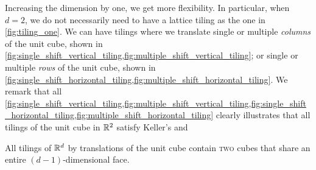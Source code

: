\documentclass[../thesis.tex]{subfiles}
\begin{document}
Increasing the dimension by one, we get more flexibility. In particular, when $d=2$, we do not necessarily need to have a lattice tiling as the one in \cref{fig:tiling_one}. We can have tilings where we translate single or multiple \emph{columns} of the unit cube, shown in \cref{fig:single_shift_vertical_tiling,fig:multiple_shift_vertical_tiling}; or single or multiple \emph{rows} of the unit cube, shown in \cref{fig:single_shift_horizontal_tiling,fig:multiple_shift_horizontal_tiling}.  We remark that all \cref{fig:single_shift_vertical_tiling,fig:multiple_shift_vertical_tiling,fig:single_shift_horizontal_tiling,fig:multiple_shift_horizontal_tiling} clearly illustrates that all tilings of the unit cube in $\mathbb{R}^2$  satisfy  Keller's  and 





\begin{conjecture}\label{conj:keller_tiling}
    All tilings of $\mathbb{R}^d$ by translations of the unit cube contain \textsc{two} cubes that share an entire $(d-1)$-dimensional face.
\end{conjecture}  %


\end{document}
